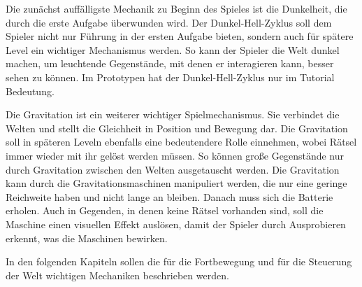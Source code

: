 
Die zunächst auffälligste Mechanik zu Beginn des Spieles ist die Dunkelheit, die durch die erste Aufgabe überwunden wird. Der Dunkel-Hell-Zyklus soll dem Spieler nicht nur Führung in der ersten Aufgabe bieten, sondern auch für spätere Level ein wichtiger Mechanismus werden. So kann der Spieler die Welt dunkel machen, um leuchtende Gegenstände, mit denen er interagieren kann, besser sehen zu können. Im Prototypen hat der Dunkel-Hell-Zyklus nur im Tutorial Bedeutung.

Die Gravitation ist ein weiterer wichtiger Spielmechanismus. Sie verbindet die Welten und stellt die Gleichheit in Position und Bewegung dar. Die Gravitation soll in späteren Leveln ebenfalls eine bedeutendere Rolle einnehmen, wobei Rätsel immer wieder mit ihr gelöst werden müssen. So können große Gegenstände nur durch Gravitation zwischen den Welten  ausgetauscht werden. Die Gravitation kann durch die Gravitationsmaschinen manipuliert werden, die nur eine geringe Reichweite haben und nicht lange an bleiben. Danach muss sich die Batterie erholen. Auch in Gegenden, in denen keine Rätsel vorhanden sind, soll die Maschine einen visuellen Effekt auslösen, damit der Spieler durch Ausprobieren erkennt, was die Maschinen bewirken.

In den folgenden Kapiteln sollen die für die Fortbewegung und für die Steuerung der Welt wichtigen Mechaniken beschrieben werden.